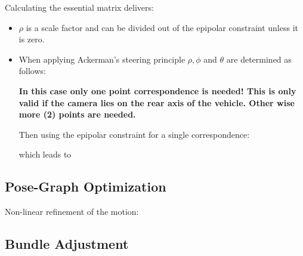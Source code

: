 \documentclass[10pt,a4paper]{scrartcl}
\begin{document}
\begin{multicols*}{2}
Calculating the essential matrix delivers:


\begin{itemize}
\item $\rho$ is a scale factor and can be divided out of the epipolar constraint unless it is zero.
\item When applying Ackerman's steering principle $\rho,\phi$ and $\theta$ are determined as follows:


\textbf{In this case only one point correspondence is needed! This is only valid if the camera lies on the rear axis of the vehicle. Other wise more (2) points are needed.}


Then using the epipolar constraint for a single correspondence:


which leads to


\end{itemize}

\subsection{Pose-Graph Optimization}

Non-linear refinement of the motion:



\subsection{Bundle Adjustment}


\end{multicols*}
\end{document}
